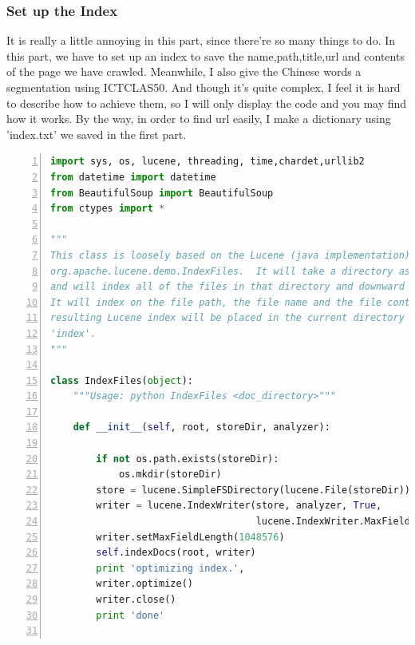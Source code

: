 \documentclass{article}
\begin{document}
\subsubsection{Set up the Index}
It is really a little annoying in this part, since there're so many things to do. In this part, we have to set up an index to save the name,path,title,url and contents of the page we have crawled. Meanwhile, I also give the Chinese words a segmentation using ICTCLAS50. And though it's quite complex, I feel it is hard to describe how to achieve them, so I will only display the code and you may find how it works. By the way, in order to find url easily, I make a dictionary using 'index.txt' we saved in the first part.\\
\begin{lstlisting}[language=python,numbers=left,frame=leftline]
import sys, os, lucene, threading, time,chardet,urllib2
from datetime import datetime
from BeautifulSoup import BeautifulSoup
from ctypes import *

"""
This class is loosely based on the Lucene (java implementation) demo class
org.apache.lucene.demo.IndexFiles.  It will take a directory as an argument
and will index all of the files in that directory and downward recursively.
It will index on the file path, the file name and the file contents.  The
resulting Lucene index will be placed in the current directory and called
'index'.
"""

class IndexFiles(object):
    """Usage: python IndexFiles <doc_directory>"""

    def __init__(self, root, storeDir, analyzer):

        if not os.path.exists(storeDir):
            os.mkdir(storeDir)
        store = lucene.SimpleFSDirectory(lucene.File(storeDir))
        writer = lucene.IndexWriter(store, analyzer, True,
                                    lucene.IndexWriter.MaxFieldLength.LIMITED)
        writer.setMaxFieldLength(1048576)
        self.indexDocs(root, writer)
        print 'optimizing index.',
        writer.optimize()
        writer.close()
        print 'done'


\end{lstlisting}
\end{document}
